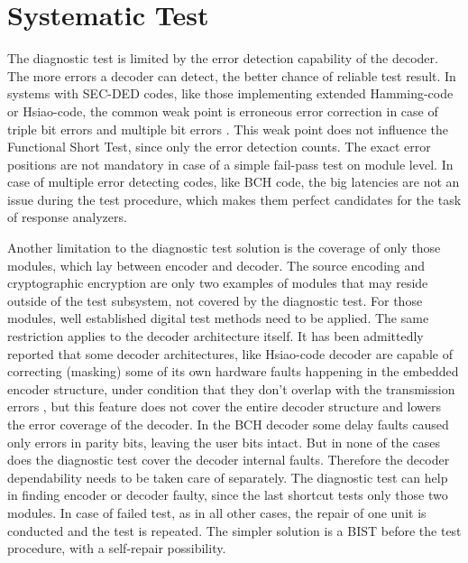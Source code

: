 \section{Systematic Test}

The diagnostic test is limited by the error detection capability of the decoder. The more errors a decoder can detect, the better chance of reliable test result. In systems with SEC-DED codes, like those implementing extended Hamming-code or Hsiao-code, the common weak point is erroneous error correction in case of triple bit errors and multiple bit errors \cite{art:Dicorato}. This weak point does not influence the Functional Short Test, since only the error detection counts. The exact error positions are not mandatory in case of a simple fail-pass test on module level. In case of multiple error detecting codes, like BCH code, the big latencies are not an issue during the test procedure, which makes them perfect candidates for the task of response analyzers.

Another limitation to the diagnostic test solution is the coverage of only those modules, which lay between encoder and decoder. The source encoding and cryptographic encryption are only two examples of modules that may reside outside of the test subsystem, not covered by the diagnostic test. For those modules, well established digital test methods need to be applied. The same restriction applies to the decoder architecture itself. It has been admittedly reported that some decoder architectures, like Hsiao-code decoder are capable of correcting (masking) some of its own hardware faults happening in the embedded encoder structure, under condition that they don't overlap with the transmission errors \cite{art:Dicorato}, but this feature does not cover the entire decoder structure and lowers the error coverage of the decoder. In the BCH decoder some delay faults caused only errors in parity bits, leaving the user bits intact. But in none of the cases does the diagnostic test cover the decoder internal faults. Therefore the decoder dependability needs to be taken care of separately. The diagnostic test can help in finding encoder or decoder faulty, since the last shortcut tests only those two modules. In case of failed test, as in all other cases, the repair of one unit is conducted and the test is repeated. The simpler solution is a BIST before the test procedure, with a self-repair possibility.

